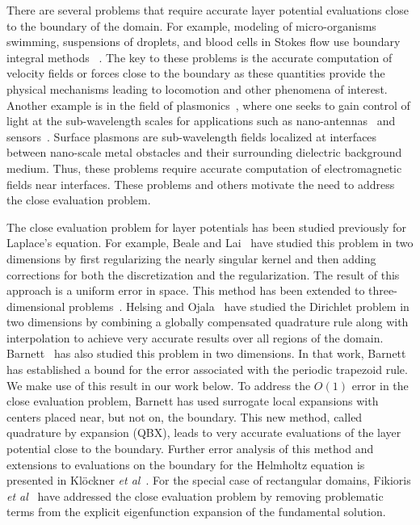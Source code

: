 \documentclass{article}[12pt]
\numberwithin{equation}{section}
\begin{document}
%
%
%
%
There are several problems that require accurate layer
  potential evaluations close to the boundary of the domain. For
example, modeling of micro-organisms swimming, suspensions of
droplets, and blood cells in Stokes flow use boundary integral methods
~\cite{smith2009boundary, barnett2015spectrally, marple2016fast,
  keaveny2011applying}. The key to these problems is the accurate
computation of velocity fields or forces close to the boundary as
these quantities provide the physical mechanisms leading to locomotion
and other phenomena of interest.  Another example is in the field of
plasmonics~\cite{Maier07}, where one seeks to gain control of light at
the sub-wavelength scales for applications such as
nano-antennas~\cite{akselrod2014probing,novotny2011antennas} and
sensors~\cite{mayer2008label,sannomiya2008situ}.  Surface plasmons are
sub-wavelength fields localized at interfaces between nano-scale metal
obstacles and their surrounding dielectric background medium.  Thus,
these problems require accurate computation of electromagnetic fields
near interfaces. These problems and others motivate
  the need to address the close evaluation problem.

The close evaluation problem for layer potentials has been studied
previously for Laplace's equation.  For example, Beale and
Lai~\cite{beale2001method} have studied this problem in two dimensions
by first regularizing the nearly singular kernel and then adding
corrections for both the discretization and the regularization. The
result of this approach is a uniform error in space.  This method has
been extended to three-dimensional problems~\cite{beal2016asimple}.
Helsing and Ojala~\cite{helsing2008evaluation} have studied the
Dirichlet problem in two dimensions by combining a globally
compensated quadrature rule along with interpolation to achieve very
accurate results over all regions of the domain.
Barnett~\cite{barnett2014evaluation} has also studied this problem in
two dimensions. In that work, Barnett has established a bound for the
error associated with the periodic trapezoid rule.  We make use of
this result in our work below.  To address the $O(1)$ error in the
close evaluation problem, Barnett has used surrogate local expansions
with centers placed near, but not on, the boundary. 
  This new method, called quadrature by expansion (QBX), leads to very
  accurate evaluations of the layer potential close to the
  boundary. Further error analysis of this method and extensions to
  evaluations on the boundary for the Helmholtz equation is presented in
  Kl\"{o}ckner {\it et al}~\cite{klockneretal2013}.  
 For the special case of rectangular domains, Fikioris
  {\it et al}~\cite{fikioris1987strongly, fikioris1988strongly} have
  addressed the close evaluation problem by removing problematic terms
  from the explicit eigenfunction expansion of the fundamental
  solution.  
\end{document}
